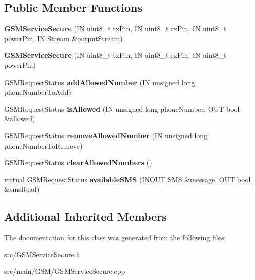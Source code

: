 \subsection*{Public Member Functions}
\begin{DoxyCompactItemize}
\item 
\mbox{\label{class_easyuino_1_1_g_s_m_service_secure_ab28bad6e7765f61851a3957edc5d3071}} 
{\bfseries G\+S\+M\+Service\+Secure} (IN uint8\+\_\+t tx\+Pin, IN uint8\+\_\+t rx\+Pin, IN uint8\+\_\+t power\+Pin, IN Stream \&output\+Stream)
\item 
\mbox{\label{class_easyuino_1_1_g_s_m_service_secure_a4331122e2c6e42711eb13bf59cfd940c}} 
{\bfseries G\+S\+M\+Service\+Secure} (IN uint8\+\_\+t tx\+Pin, IN uint8\+\_\+t rx\+Pin, IN uint8\+\_\+t power\+Pin)
\item 
\mbox{\label{class_easyuino_1_1_g_s_m_service_secure_a7acbf1d460ef1b81bcd36d852b596af3}} 
G\+S\+M\+Request\+Status {\bfseries add\+Allowed\+Number} (IN unsigned long phone\+Number\+To\+Add)
\item 
\mbox{\label{class_easyuino_1_1_g_s_m_service_secure_a791dd872fe2c72311d84219616e5f54c}} 
G\+S\+M\+Request\+Status {\bfseries is\+Allowed} (IN unsigned long phone\+Number, O\+UT bool \&allowed)
\item 
\mbox{\label{class_easyuino_1_1_g_s_m_service_secure_a1ad4988fa2dcc0ba8f87c70cf71edf29}} 
G\+S\+M\+Request\+Status {\bfseries remove\+Allowed\+Number} (IN unsigned long phone\+Number\+To\+Remove)
\item 
\mbox{\label{class_easyuino_1_1_g_s_m_service_secure_a10a8160dfb473d84b4bd182d689bdb95}} 
G\+S\+M\+Request\+Status {\bfseries clear\+Allowed\+Numbers} ()
\item 
\mbox{\label{class_easyuino_1_1_g_s_m_service_secure_acd045866feff695131d00d7bdd9def0a}} 
virtual G\+S\+M\+Request\+Status {\bfseries available\+S\+MS} (I\+N\+O\+UT \hyperlink{class_easyuino_1_1_s_m_s}{S\+MS} \&message, O\+UT bool \&sms\+Read)
\end{DoxyCompactItemize}
\subsection*{Additional Inherited Members}


The documentation for this class was generated from the following files\+:\begin{DoxyCompactItemize}
\item 
src/G\+S\+M\+Service\+Secure.\+h\item 
src/main/\+G\+S\+M/G\+S\+M\+Service\+Secure.\+cpp\end{DoxyCompactItemize}

